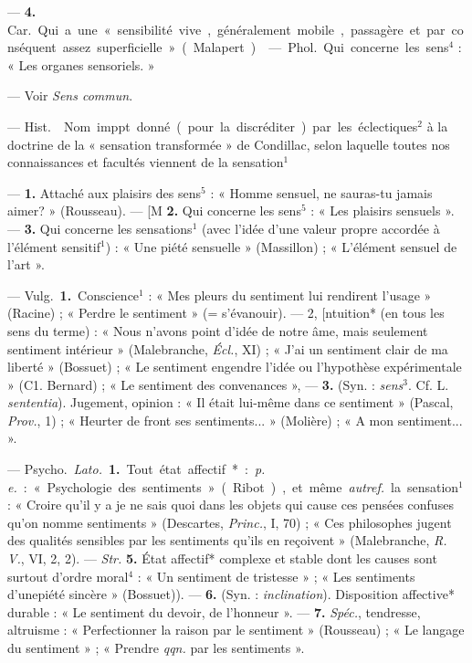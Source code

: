 \begin{itemize}[leftmargin=1cm, label=, itemsep=1pt]
— {\bf 4.} \si{Car.} Qui a une « sensibilité vive, généralement mobile,
passagère et par conséquent assez superficielle » (Malapert).

 — \si{Phol.} Qui concerne les
sens$^4$ : « Les organes sensoriels. »

 — Voir {\it Sens commun}.

 — \si{Hist.}  Nom imppt. donné (pour la
discréditer) par les éclectiques$^2$ à la doctrine de la « sensation
transformée » de Condillac, selon laquelle toutes nos connaissances et
facultés viennent de la sensation$^1$

 —  {\bf 1.} Attaché aux plaisirs
des sens$^5$ : « Homme sensuel, ne
sauras-tu jamais aimer? » (Rousseau). — [M {\bf 2.} Qui concerne les
sens$^5$ : « Les plaisirs sensuels ». —  {\bf 3.} Qui concerne les
sensations$^1$ (avec l’idée d’une valeur propre accordée à l'élément
sensitif$^1$) : « Une piété sensuelle » (Massillon) ; « L'élément sensuel de
l’art ».

 — \si{Vulg.} {\bf 1.} Conscience$^1$ : « Mes pleurs du
sentiment lui rendirent l’usage » (Racine) ; « Perdre le sentiment » (=
s’évanouir). — 2, [ntuition* (en tous les sens du terme) : « Nous n’avons
point d'idée de notre âme, mais seulement sentiment intérieur » (Malebranche,
{\it Écl.}, XI) ; « J’ai un sentiment clair de ma liberté » (Bossuet) ; « Le
sentiment engendre l’idée ou l'hypothèse expérimentale » (C1. Bernard) ; « Le
sentiment des convenances », — {\bf 3.} (Syn. : {\it sens}$^3$. Cf. L.
{\it sententia}). Jugement, opinion : « Il était lui-même dans ce
sentiment » (Pascal, {\it Prov.}, 1) ; « Heurter de front ses
sentiments... » (Molière) ; « A mon sentiment... ».

— \si{Psycho.} {\it Lato.} {\bf 1.} Tout état affectif* : {\it p. e.} :
« Psychologie des sentiments » (Ribot), et même {\it autref.} la
sensation$^1$ : « Croire qu'il y a je ne sais quoi dans les objets qui cause
ces pensées confuses qu’on nomme sentiments » (Descartes, {\it Princ.}, I,
70) ; « Ces philosophes jugent des qualités sensibles par les sentiments
qu'ils en reçoivent » (Malebranche, {\it R. V.}, VI, 2, 2). — {\it Str.}
{\bf 5.} État affectif* complexe et stable dont les causes sont surtout
d'ordre moral$^4$ : « Un sentiment de tristesse » ; « Les sentiments d’unepiété sincère » (Bossuet)). — {\bf 6.} (Syn. : {\it inclination}).
Disposition affective* durable : « Le sentiment du devoir, de l'honneur ». —
{\bf 7.} {\it Spéc.}, tendresse, altruisme : « Perfectionner la raison par le
sentiment » (Rousseau) ; « Le
langage du sentiment » ; « Prendre {\it qqn.} par les sentiments ».


\end{itemize}
